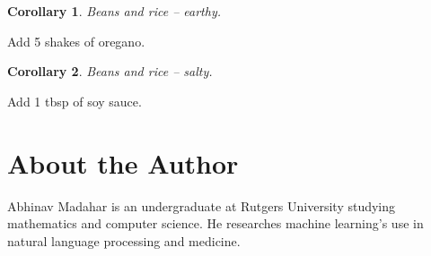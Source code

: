\documentclass[twocolumn]{amsart}
\newtheorem{cor}{Corollary}
\begin{document}
\vspace{1em}
\begin{cor} Beans and rice -- earthy. \end{cor}
Add 5 shakes of oregano.

\vspace{1em}
\begin{cor} Beans and rice -- salty. \end{cor}
Add 1 tbsp of soy sauce.

\section{About the Author}

Abhinav Madahar is an undergraduate at Rutgers University studying mathematics
and computer science. He researches machine learning's use in natural language
processing and medicine.
\end{document}
